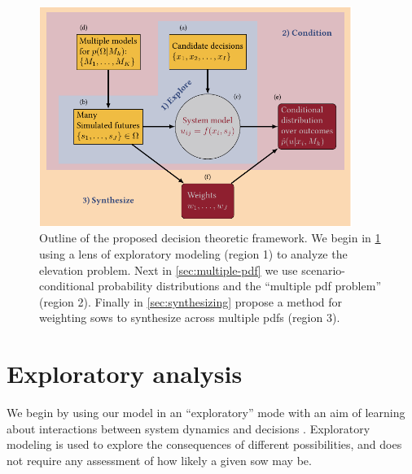 \documentclass[12pt]{article}
\begin{document}
\begin{figure}
    \centering
    \includegraphics[width=4in]{bayes-rdm.pdf}
    \caption{
        Outline of the proposed decision theoretic framework.
        We begin in \cref{sec:multiple-simulation} using a lens of exploratory modeling (region 1) to analyze the elevation problem.
        Next in \cref{sec:multiple-pdf} we use scenario-conditional probability distributions and the ``multiple \acrshort{pdf} problem'' (region 2).
        Finally in \cref{sec:synthesizing} propose a method for weighting \glspl{sow} to synthesize across multiple \glspl{pdf} (region 3).
    }\label{fig:flowchart}
\end{figure}

\section{Exploratory analysis}\label{sec:multiple-simulation}

We begin by using our model in an ``exploratory'' mode with an aim of learning about interactions between system dynamics and decisions \citep[see][]{bankes:1993}.
Exploratory modeling is used to explore the consequences of different possibilities, and does not require any assessment of how likely a given \gls{sow} may be.
\end{document}
